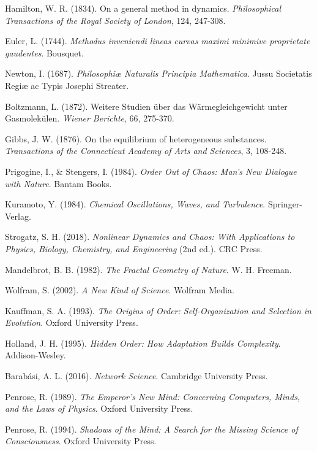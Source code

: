 \documentclass[12pt,a4paper]{article}
\begin{document}
\begin{thebibliography}{99}
Hamilton, W. R. (1834). On a general method in dynamics. \textit{Philosophical Transactions of the Royal Society of London}, 124, 247-308.

Euler, L. (1744). \textit{Methodus inveniendi lineas curvas maximi minimive proprietate gaudentes}. Bousquet.

Newton, I. (1687). \textit{Philosophiæ Naturalis Principia Mathematica}. Jussu Societatis Regiæ ac Typis Josephi Streater.

Boltzmann, L. (1872). Weitere Studien über das Wärmegleichgewicht unter Gasmolekülen. \textit{Wiener Berichte}, 66, 275-370.

Gibbs, J. W. (1876). On the equilibrium of heterogeneous substances. \textit{Transactions of the Connecticut Academy of Arts and Sciences}, 3, 108-248.

Prigogine, I., \& Stengers, I. (1984). \textit{Order Out of Chaos: Man's New Dialogue with Nature}. Bantam Books.

Kuramoto, Y. (1984). \textit{Chemical Oscillations, Waves, and Turbulence}. Springer-Verlag.

Strogatz, S. H. (2018). \textit{Nonlinear Dynamics and Chaos: With Applications to Physics, Biology, Chemistry, and Engineering} (2nd ed.). CRC Press.

Mandelbrot, B. B. (1982). \textit{The Fractal Geometry of Nature}. W. H. Freeman.

Wolfram, S. (2002). \textit{A New Kind of Science}. Wolfram Media.

Kauffman, S. A. (1993). \textit{The Origins of Order: Self-Organization and Selection in Evolution}. Oxford University Press.

Holland, J. H. (1995). \textit{Hidden Order: How Adaptation Builds Complexity}. Addison-Wesley.

Barabási, A. L. (2016). \textit{Network Science}. Cambridge University Press.

Penrose, R. (1989). \textit{The Emperor's New Mind: Concerning Computers, Minds, and the Laws of Physics}. Oxford University Press.

Penrose, R. (1994). \textit{Shadows of the Mind: A Search for the Missing Science of Consciousness}. Oxford University Press.


\end{thebibliography}
\end{document}
